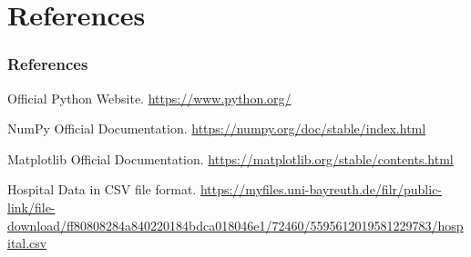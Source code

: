 \documentclass{beamer}
\begin{document}



    

\section{References}
\begin{frame}
\frametitle{References}
\begin{thebibliography}{9}
Official Python Website.
\url{https://www.python.org/}

NumPy Official Documentation.
\url{https://numpy.org/doc/stable/index.html}

Matplotlib Official Documentation.
\url{https://matplotlib.org/stable/contents.html}

Hospital Data in CSV file format.
\url{https://myfiles.uni-bayreuth.de/filr/public-link/file-download/ff80808284a840220184bdca018046e1/72460/5595612019581229783/hospital.csv}
\end{thebibliography}
\end{frame}
\end{document}

